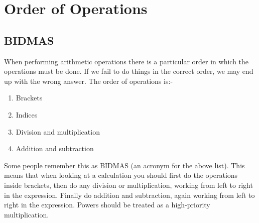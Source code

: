 





%





\section{Order of Operations}

\subsection{BIDMAS}


When performing arithmetic operations 
 there is a particular order in which the
operations must be done.  If we fail to do things in the correct order,
we may end up with the wrong answer.  The order of operations is:-
\begin{enumerate}
\item
  Brackets
\item
  Indices
\item
  Division and multiplication
\item 
  Addition and subtraction
\end{enumerate}

Some people remember this as BIDMAS (an acronym for the above list).
This means that when looking at a calculation you should first do the
operations inside brackets, then do any division or multiplication,
working from left to right in the expression.
Finally do addition and subtraction, again working from left to right
in the expression.  
Powers should be treated as a
high-priority multiplication.


